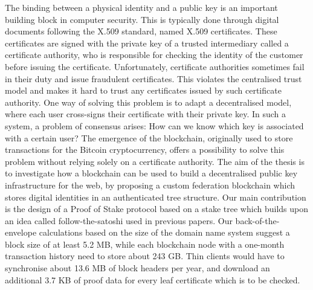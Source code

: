 The binding between a physical identity and a public key is an important building block in computer security. This is typically done through digital documents following the X.509 standard, named X.509 certificates. These certificates are signed with the private key of a trusted intermediary called a certificate authority, who is responsible for checking the identity of the customer before issuing the certificate. Unfortunately, certificate authorities sometimes fail in their duty and issue fraudulent certificates. This violates the centralised trust model and makes it hard to trust any certificates issued by such certificate authority. One way of solving this problem is to adapt a decentralised model, where each user cross-signs their certificate with their private key. In such a system, a problem of consensus arises: How can we know which key is associated with a certain user? The emergence of the blockchain, originally used to store transactions for the Bitcoin cryptocurrency, offers a possibility to solve this problem without relying solely on a certificate authority. The aim of the thesis is to investigate how a blockchain can be used to build a decentralised public key infrastructure for the web, by proposing a custom federation blockchain which stores digital identities in an authenticated tree structure. Our main contribution is the design of a Proof of Stake protocol based on a stake tree which builds upon an idea called follow-the-satoshi used in previous papers. Our back-of-the-envelope calculations based on the size of the domain name system suggest a block size of at least 5.2 MB, while each blockchain node with a one-month transaction history need to store about 243 GB. Thin clients would have to synchronise about 13.6 MB of block headers per year, and download an additional 3.7 KB of proof data for every leaf certificate which is to be checked.